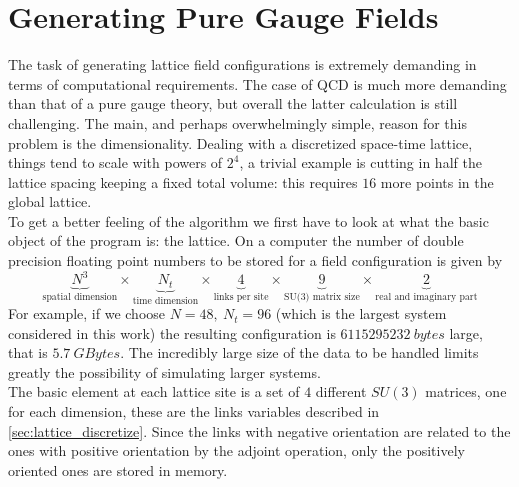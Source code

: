 \section{Generating Pure Gauge Fields}
The task of generating lattice field configurations is extremely demanding in terms of computational requirements. The case of QCD is much more demanding than that of a pure gauge theory, but overall the latter calculation is still challenging. The main, and perhaps overwhelmingly simple, reason for this problem is the dimensionality. Dealing with a discretized space-time lattice, things tend to scale with powers of $2^4$, a trivial example is cutting in half the lattice spacing keeping a fixed total volume: this requires $16$ more points in the global lattice. \\
To get a better feeling of the algorithm we first have to look at what the basic object of the program is: the lattice. On a computer the number of double precision floating point numbers to be stored for a field configuration is given by
\begin{equation}
    \underbrace{N^3}_\text{spatial dimension} \times
    \underbrace{N_t}_\text{time dimension} \times
    \underbrace{4}_\text{links per site} \times 
    \underbrace{9}_\text{SU(3) matrix size} \times
    \underbrace{2}_\text{real and imaginary part}
\end{equation}
For example, if we choose $N=48,~N_t=96$ (which is the largest system considered in this work) the resulting configuration is $6115295232~bytes$ large, that is $5.7~GBytes$.  The incredibly large size of the data to be handled limits greatly the possibility of simulating larger systems. \\
The basic element at each lattice site is a set of $4$ different $SU(3)$ matrices, one for each dimension, these are the links variables described in \cref{sec:lattice_discretize}. Since the links with negative orientation are related to the ones with positive orientation by the adjoint operation, only the positively oriented ones are stored in memory.  

